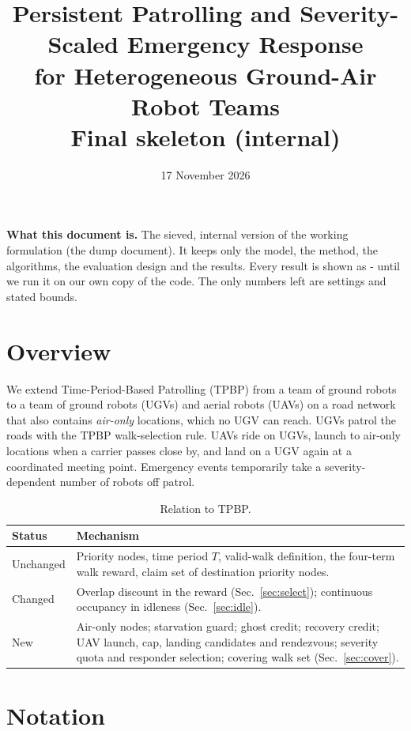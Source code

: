 \documentclass[11pt]{article}
\title{Persistent Patrolling and Severity-Scaled Emergency Response\\
for Heterogeneous Ground-Air Robot Teams\\[4pt]
\large Final skeleton (internal)}
\author{}
\date{17 November 2026}
\theoremstyle{definition}
\theoremstyle{plain}
\begin{document}
\maketitle
\vspace{-2em}

\noindent\textbf{What this document is.} The sieved, internal version of
the working formulation (the dump document). It keeps only
the model, the method, the algorithms, the evaluation design and the
results. Every result is shown as - until we run it on our own copy of
the code. The only numbers left
are settings and stated bounds.

\section{Overview}

We extend Time-Period-Based Patrolling (TPBP) from a team of ground robots
to a team of ground robots (UGVs) and aerial robots (UAVs) on a road
network that also contains \emph{air-only} locations, which no UGV can
reach. UGVs patrol the roads with the TPBP walk-selection rule. UAVs ride
on UGVs, launch to air-only locations when a carrier passes close by, and
land on a UGV again at a coordinated meeting point. Emergency events
temporarily take a severity-dependent number of robots off patrol.

\begin{table}[H]
\centering
\small
\caption{Relation to TPBP.}
\label{tab:new}
\begin{tabularx}{\linewidth}{lX}
\toprule
Status & Mechanism \\
\midrule
Unchanged & Priority nodes, time period $T$, valid-walk definition, the four-term walk reward, claim set of destination priority nodes. \\
Changed & Overlap discount in the reward (Sec.~\ref{sec:select}); continuous occupancy in idleness (Sec.~\ref{sec:idle}). \\
New & Air-only nodes; starvation guard; ghost credit; recovery credit; UAV launch, cap, landing candidates and rendezvous; severity quota and responder selection; covering walk set (Sec.~\ref{sec:cover}). \\
\bottomrule
\end{tabularx}
\end{table}

\section{Notation}
\end{document}
